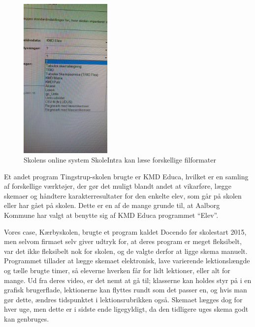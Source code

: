 \begin{figure}[h!]
	\centering
	\includegraphics[width=0.4\textwidth]{../Billeder/Skemaimportering_filtyper_Intra.jpg}
	\caption{Skolens online system SkoleIntra kan læse forskellige filformater}
	\label{fig:kompatibleFiltyper}
\end{figure}
\FloatBarrier
Et andet program Tingstrup-skolen brugte er KMD Educa, hvilket er en samling af forskellige værktøjer\cite{KMD}, der gør det muligt blandt andet at vikarføre, lægge skemaer og håndtere karakterresultater for den enkelte elev, som går på skolen eller har gået på skolen. Dette er en af de mange grunde til, at Aalborg Kommune har valgt at benytte sig af KMD Educa programmet ``Elev''\cite{useCase_KMD_Educa_Elev}.

Vores case, Kærbyskolen, brugte et program kaldet Docendo før skolestart 2015, men selvom firmaet selv giver udtryk for, at deres program er meget fleksibelt\cite{Docendo}, var det ikke fleksibelt nok for skolen, og de valgte derfor at ligge skema manuelt. Programmet tillader at lægge skemaet elektronisk, lave varierende lektionslængde og tælle brugte timer, så eleverne hverken får for lidt lektioner, eller alt for mange. Ud fra deres video\cite{Docendo_video}, er det nemt at gå til; klasserne kan holdes styr på i en grafisk brugerflade, lektionerne kan flyttes rundt som det passer en, og hvis man gør dette, ændres tidspunktet i lektionsrubrikken også. Skemaet lægges dog for hver uge, men dette er i sidste ende ligegyldigt, da den tidligere uges skema godt kan genbruges.

